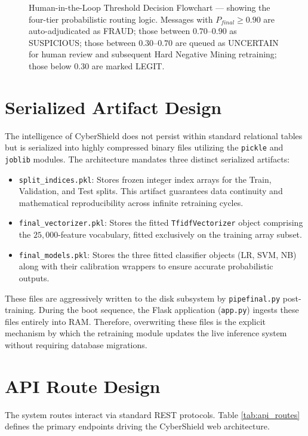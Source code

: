 \begin{figure}[H]
{
    }
    \caption{Human-in-the-Loop Threshold Decision Flowchart --- showing the four-tier probabilistic routing logic. Messages with $P_{final} \geq 0.90$ are auto-adjudicated as FRAUD; those between $0.70\text{--}0.90$ as SUSPICIOUS; those between $0.30\text{--}0.70$ are queued as UNCERTAIN for human review and subsequent Hard Negative Mining retraining; those below $0.30$ are marked LEGIT.}
    \label{fig:hitl}
\end{figure}

\section{Serialized Artifact Design}
The intelligence of CyberShield does not persist within standard relational tables but is serialized into highly compressed binary files utilizing the \texttt{pickle} and \texttt{joblib} modules. The architecture mandates three distinct serialized artifacts:
\begin{itemize}
    \item \texttt{split\_indices.pkl}: Stores frozen integer index arrays for the Train, Validation, and Test splits. This artifact guarantees data continuity and mathematical reproducibility across infinite retraining cycles.
    \item \texttt{final\_vectorizer.pkl}: Stores the fitted \texttt{TfidfVectorizer} object comprising the $25,000$-feature vocabulary, fitted exclusively on the training array subset.
    \item \texttt{final\_models.pkl}: Stores the three fitted classifier objects (LR, SVM, NB) along with their calibration wrappers to ensure accurate probabilistic outputs.
\end{itemize}
These files are aggressively written to the disk subsystem by \texttt{pipefinal.py} post-training. During the boot sequence, the Flask application (\texttt{app.py}) ingests these files entirely into RAM. Therefore, overwriting these files is the explicit mechanism by which the retraining module updates the live inference system without requiring database migrations.

\section{API Route Design}
The system routes interact via standard REST protocols. Table \ref{tab:api_routes} defines the primary endpoints driving the CyberShield web architecture.

